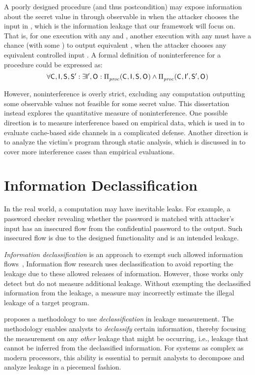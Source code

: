 A poorly designed procedure (and thus postcondition) may expose
information about the secret value in \SecFn{} through observable in
\AOOFn{} when the attacker chooses the input in \ACIFn{}, which is the
information leakage that our framework will focus on. That is, for one
execution with any \SecFn{} and \AIIFn{}, another execution with any
\SecFnAlt{} must have a chance (with some \ACIFnAlt{}) to output
equivalent \AOOFn{}, when the attacker chooses any equivalent
controlled input \ACIFn{}. A formal definition of noninterference for
a procedure \proc could be expressed as: \[ \forall
\mathsf{C}_{},\mathsf{I}_{},\mathsf{S}_{},\mathsf{S}'_{}:\exists \mathsf{I}'_{}, \mathsf{O}_{}:
\Pi_{\mathit{proc}}^{}(\mathsf{C}_{}, \mathsf{I}_{}, \mathsf{S}_{}, \mathsf{O}_{}) \wedge
\Pi_{\mathit{proc}}^{}(\mathsf{C}_{}, \mathsf{I}'_{}, \mathsf{S}'_{}, \mathsf{O}_{})
\]

However, noninterference is overly strict, excluding any computation
outputting some observable values not feasible for some secret value.  This
dissertation instead explores the quantitative measure of noninterference.
One possible direction is to measure interference based on empirical
data, which is used in  to evaluate cache-based
side channels in a complicated defense. Another direction is to
analyze the victim's program through static analysis, which is
discussed in  to cover more interference cases than
empirical evaluations. 

\section{Information Declassification}
\label{sec:intro:declass}
In the real world, a computation may have inevitable leaks. For
example, a password checker revealing whether the password is matched
with attacker's input has an insecured flow from the confidential
password to the output. Such insecured flow is due to the designed
functionality and is an intended leakage. 

\textit{Information declassification} is an approach to exempt such
allowed information flows~\cite{Sabelfeld:2009:DDP:1662658.1662659},
Information flow research uses declassification to avoid reporting the
leakage due to these allowed releases of information.  However, those
works only detect but do not measure additional leakage. Without
exempting the declassified information from the leakage, a measure may
incorrectly estimate the illegal leakage of a target program.

 proposes a methodology to use
\textit{declassification} in leakage measurement. The methodology
enables analysts to \textit{declassify} certain information, thereby
focusing the measurement on any \textit{other} leakage that might be
occurring, i.e., leakage that cannot be inferred from the declassified
information.  For systems as complex as modern processors, this
ability is essential to permit analysts to decompose and analyze
leakage in a piecemeal fashion.

